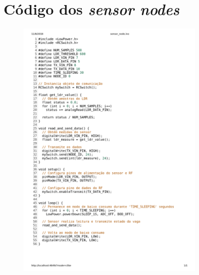 \documentclass[oneside,openright,12pt]{ufsm_2015} %
\begin{document}
\chapter{Código dos \textit{sensor nodes}}
\label{apendice:sensor-nodes-code}
        \begin{figure}[H]
        \centering
        \includegraphics[width=0.8\textwidth]{figuras/sensor_node.png}
        \vspace{\baselineskip} %
\end{figure}
\end{document}

